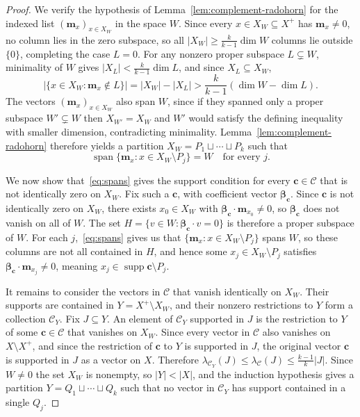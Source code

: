 \documentclass[11pt]{amsart}
\DeclareMathOperator{\Span}{span}
\begin{document}
\begin{proof}
We verify the hypothesis of Lemma~\ref{lem:complement-radohorn} for the indexed list
$(\mathbf{m}_x)_{x \in X_W}$ in the space $W$. Since every $x \in X_W
\subseteq X^+$ has $\mathbf{m}_x \neq 0$, no column lies in the zero subspace,
so all $|X_W| \geq \frac{k}{k-1}\dim W$ columns lie outside $\{0\}$, completing
the case $L = 0$. For any nonzero proper subspace $L \subsetneq W$, minimality
of $W$ gives $|X_L| < \frac{k}{k-1}\dim L$, and since $X_L \subseteq X_W$,
$$
        |\{x \in X_W : \mathbf{m}_x \notin L\}|
        = |X_W| - |X_L|
        > \frac{k}{k-1}(\dim W - \dim L).
$$
The vectors $(\mathbf{m}_x)_{x \in X_W}$ also span $W$, since if they spanned
only a proper subspace $W' \subsetneq W$ then $X_{W'} = X_W$ and $W'$ would
satisfy the defining inequality with smaller dimension, contradicting
minimality. Lemma~\ref{lem:complement-radohorn} therefore yields a partition
$X_W = P_1 \sqcup \cdots \sqcup P_k$ such that
\begin{equation}\label{eq:spans}
        \Span\{\mathbf{m}_x : x \in X_W \setminus P_j\} = W
        \quad \text{for every } j.
\end{equation}

We now show that~\eqref{eq:spans} gives the support condition for every
$\mathbf{c} \in \mathcal C$ that is not identically zero on $X_W$. Fix such
a $\mathbf{c}$, with coefficient vector $\boldsymbol{\beta}_{\mathbf{c}}$.
Since $\mathbf{c}$ is not identically zero on $X_W$, there exists $x_0 \in
X_W$ with $\boldsymbol{\beta}_{\mathbf{c}} \cdot \mathbf{m}_{x_0} \neq 0$,
so $\boldsymbol{\beta}_{\mathbf{c}}$ does not vanish on all of $W$. The set
$H = \{v \in W : \boldsymbol{\beta}_{\mathbf{c}} \cdot v = 0\}$ is therefore a
proper subspace of $W$. For each $j$,~\eqref{eq:spans} gives us that
$\{\mathbf{m}_x : x \in X_W \setminus P_j\}$ spans $W$, so these columns are
not all contained in $H$, and hence some $x_j \in X_W \setminus P_j$ satisfies
$\boldsymbol{\beta}_{\mathbf{c}} \cdot \mathbf{m}_{x_j} \neq 0$, meaning
$x_j \in \operatorname{supp} \mathbf{c} \setminus P_j$.

It remains to consider the vectors in $\mathcal C$ that vanish identically on
$X_W$. Their supports are contained in $Y = X^+ \setminus X_W$, and their
nonzero restrictions to $Y$ form a collection $\mathcal C_Y$. Fix $J \subseteq Y$.
An element of $\mathcal C_Y$ supported in $J$ is the restriction to $Y$ of
some $\mathbf{c}\in\mathcal C$ that vanishes on $X_W$. Since every vector in
$\mathcal C$ also vanishes on $X\setminus X^+$, and since the restriction of
$\mathbf{c}$ to $Y$ is supported in $J$, the original vector $\mathbf{c}$ is
supported in $J$ as a vector on $X$. Therefore
$\lambda_{\mathcal C_Y}(J) \leq \lambda_{\mathcal C}(J) \leq
\frac{k-1}{k}|J|$. Since $W \neq 0$ the set $X_W$ is nonempty, so $|Y| < |X|$,
and the induction hypothesis gives a partition $Y = Q_1 \sqcup \cdots \sqcup Q_k$
such that no vector in $\mathcal C_Y$ has support contained in a single $Q_j$.


\end{proof}
\end{document}
